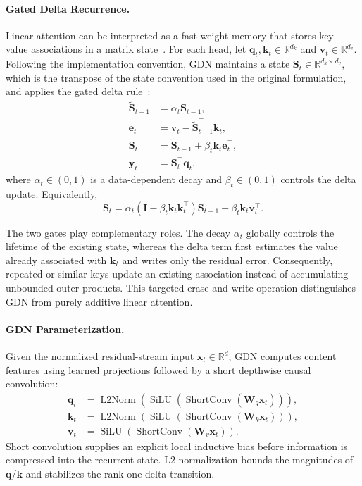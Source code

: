 \paragraph{Gated Delta Recurrence.}
\label{sec:gdn-recurrence}

Linear attention can be interpreted as a fast-weight memory that stores key--value associations in a matrix state~\citep{schlag2021linear}. For each head, let $\bm{q}_t,\bm{k}_t\in\mathbb{R}^{d_k}$ and $\bm{v}_t\in\mathbb{R}^{d_v}$. Following the implementation convention, GDN maintains a state $\bm{S}_t\in\mathbb{R}^{d_k\times d_v}$, which is the transpose of the state convention used in the original formulation, and applies the gated delta rule~\citep{yang2024gated}:
\begin{align}
\widetilde{\bm{S}}_{t-1} &= \alpha_t \bm{S}_{t-1}, \\
\bm{e}_t &= \bm{v}_t - \widetilde{\bm{S}}_{t-1}^{\top}\bm{k}_t, \\
\bm{S}_t &= \widetilde{\bm{S}}_{t-1}
    + \beta_t\bm{k}_t\bm{e}_t^{\top}, \\
\bm{y}_t &= \bm{S}_t^{\top}\bm{q}_t,
\end{align}
where $\alpha_t\in(0,1)$ is a data-dependent decay and $\beta_t\in(0,1)$ controls the delta update. Equivalently,
\begin{equation}
\bm{S}_t
= \alpha_t\left(\bm{I}-\beta_t\bm{k}_t\bm{k}_t^{\top}\right)\bm{S}_{t-1}
+ \beta_t\bm{k}_t\bm{v}_t^{\top}.
\end{equation}

The two gates play complementary roles. The decay $\alpha_t$ globally controls the lifetime of the existing state, whereas the delta term first estimates the value already associated with $\bm{k}_t$ and writes only the residual error. Consequently, repeated or similar keys update an existing association instead of accumulating unbounded outer products. This targeted erase-and-write operation distinguishes GDN from purely additive linear attention.

\paragraph{GDN Parameterization.}
\label{sec:gdn-parameterization}

Given the normalized residual-stream input $\bm{x}_t\in\mathbb{R}^{d}$, GDN computes content features using learned projections followed by a short depthwise causal convolution:
\begin{align}
\bm{q}_t &= \operatorname{L2Norm}\left(\operatorname{SiLU}\left(\operatorname{ShortConv}(\bm{W}_q\bm{x}_t)\right)\right), \\
\bm{k}_t &= \operatorname{L2Norm}\left(\operatorname{SiLU}\left(\operatorname{ShortConv}(\bm{W}_k\bm{x}_t)\right)\right), \\
\bm{v}_t &= \operatorname{SiLU}\left(\operatorname{ShortConv}(\bm{W}_v\bm{x}_t)\right).
\end{align}
Short convolution supplies an explicit local inductive bias before information is compressed into the recurrent state. L2 normalization bounds the magnitudes of $\bm{q}$/$\bm{k}$ and stabilizes the rank-one delta transition.

